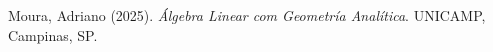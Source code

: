 \documentclass[a4paper, 17pt]{extarticle}
\begin{document}
 
 
 


\begin{thebibliography}{9}


Moura, Adriano (2025). \textit{Álgebra Linear com Geometría Analítica}. UNICAMP, Campinas, SP. 

\end{thebibliography}


\end{document}
